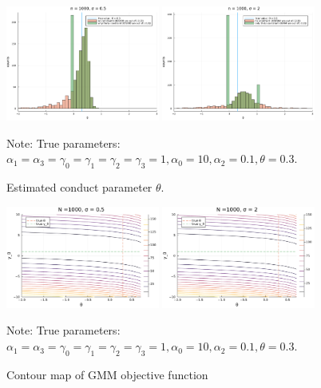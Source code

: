 \documentclass[11pt, a4paper]{article}
\begin{document}
\begin{figure}[!htbp]
  \begin{center}
  \includegraphics[width = 0.45\textwidth]
  {figuretable/histogram_loglinear_loglinear_n_1000_sigma_0.5.pdf}
  \includegraphics[width = 0.45\textwidth]
  {figuretable/histogram_loglinear_loglinear_n_1000_sigma_2.pdf}
  \caption{Estimated conduct parameter $\theta$.}
  \label{fg:histogram_loglinear_loglinear_n_1000_sigma_2} 
  \end{center}
  \footnotesize
  Note: True parameters: $\alpha_1 = \alpha_3 = \gamma_0 = \gamma_1 = \gamma_2  = \gamma_3 = 1, \alpha_0 = 10, \alpha_2 = 0.1,  \theta = 0.3.$
\end{figure} 

\begin{figure}[!htbp]
  \begin{center}
  \includegraphics[width = 0.45\textwidth]
  {figuretable/contour_loglinear_loglinear_n_1000_sigma_0.5.pdf}
  \includegraphics[width = 0.45\textwidth]
  {figuretable/contour_loglinear_loglinear_n_1000_sigma_2.pdf}
  \caption{Contour map of GMM objective function}
  \label{fg:contour_loglinear_loglinear_n_1000_sigma_2} 
  \end{center}
  \footnotesize
  Note: True parameters: $\alpha_1 = \alpha_3 = \gamma_0 = \gamma_1 = \gamma_2  = \gamma_3 = 1, \alpha_0 = 10, \alpha_2 = 0.1,  \theta = 0.3.$
\end{figure} 
\end{document}
